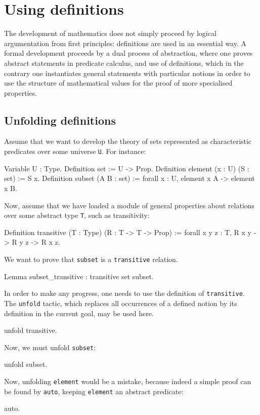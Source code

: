 \documentclass[11pt,a4paper]{book}
\begin{document}
\section{Using definitions}

The development of mathematics does not simply proceed by logical 
argumentation from first principles: definitions are used in an essential way.
A formal development proceeds by a dual process of abstraction, where one
proves abstract statements in predicate calculus, and use of definitions, 
which in the contrary one instantiates general statements with particular 
notions in order to use the structure of mathematical values for the proof of
more specialised properties.

\subsection{Unfolding definitions}

Assume that we want to develop the theory of sets represented as characteristic
predicates over some universe \verb:U:. For instance:
\begin{coq_example}
Variable U : Type.
Definition set := U -> Prop.
Definition element (x : U) (S : set) := S x.
Definition subset (A B : set) := 
  forall x : U, element x A -> element x B.
\end{coq_example}

Now, assume that we have loaded a module of general properties about
relations over some abstract type \verb:T:, such as transitivity:

\begin{coq_example}
Definition transitive (T : Type) (R : T -> T -> Prop) :=
  forall x y z : T, R x y -> R y z -> R x z.
\end{coq_example}

We want to prove that \verb:subset: is a \verb:transitive:
relation. 
\begin{coq_example}
Lemma subset_transitive : transitive set subset.
\end{coq_example}

In order to make any progress, one needs to use the definition of
\verb:transitive:. The \verb:unfold: tactic, which replaces all
occurrences of a defined notion by its definition in the current goal,
may be used here.
\begin{coq_example}
unfold transitive.
\end{coq_example}

Now, we must unfold \verb:subset::
\begin{coq_example}
unfold subset.
\end{coq_example}
Now, unfolding \verb:element: would be a mistake, because indeed a simple proof
can be found by \verb:auto:, keeping \verb:element: an abstract predicate:
\begin{coq_example}
auto.
\end{coq_example}
\end{document}
